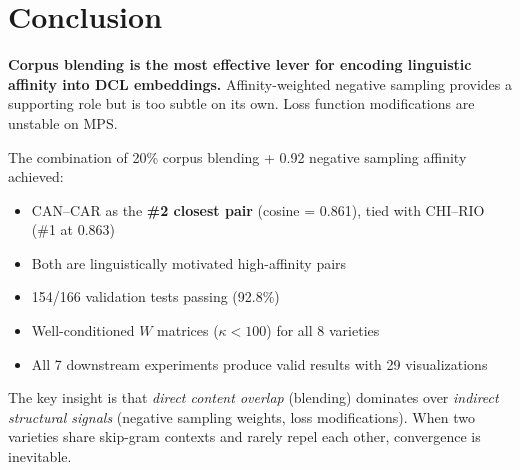 \documentclass[11pt,a4paper]{article}
\begin{document}
\section{Conclusion}

\textbf{Corpus blending is the most effective lever for encoding linguistic affinity into DCL embeddings.} Affinity-weighted negative sampling provides a supporting role but is too subtle on its own. Loss function modifications are unstable on MPS.

The combination of 20\% corpus blending + 0.92 negative sampling affinity achieved:

\begin{itemize}[nosep]
\item CAN--CAR as the \textbf{\#2 closest pair} (cosine = 0.861), tied with CHI--RIO (\#1 at 0.863)
\item Both are linguistically motivated high-affinity pairs
\item 154/166 validation tests passing (92.8\%)
\item Well-conditioned $W$ matrices ($\kappa < 100$) for all 8 varieties
\item All 7 downstream experiments produce valid results with 29 visualizations
\end{itemize}

The key insight is that \emph{direct content overlap} (blending) dominates over \emph{indirect structural signals} (negative sampling weights, loss modifications). When two varieties share skip-gram contexts and rarely repel each other, convergence is inevitable.

\end{document}
